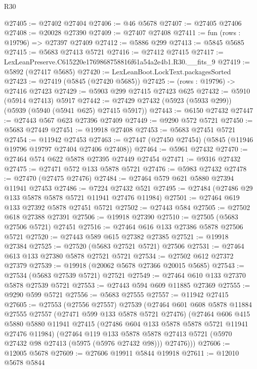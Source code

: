 \begin{lexlean}{R30}
\begin{coremodule}
@27405 := @27402 @27404
@27406 := @46 @5678
@27407 := @27405 @27406
@27408 := @20028 @27390
@27409 := @27407 @27408
@27411 := fun (rows : @19796) => @27397 @27409
@27412 := @5886 @299
@27413 := @5845 @5685
@27415 := @5683 @27413 @5721
@27416 := @27412 @27415
@27417 := LexLeanPreserve.C615220e1769868758816f61a54a2e4b1.R30.__fits_9
@27419 := @5892 (@27417 @5685)
@27420 := LexLeanBoot.LockText.packagesSorted
@27423 := @27419 (@5845 (@27420 @5685))
@27425 := (rows : @19796) -> @27416 @27423
@27429 := @5903 @299 @27415 @27423 @625
@27432 := @5910 (@5914 @27413) @5917
@27442 := @27429 @27432 (@5923 (@5933 @299)) (@5939 (@5940 (@5941 @625) @27415 @5917))
@27443 := @6150 @27432
@27447 := @27443 @567 @623 @27396 @27409
@27449 := @9290 @572 @5721
@27450 := @5683 @27449
@27451 := @19918 @27408
@27453 := @5683 @27451 @5721
@27454 := @11942 @27453
@27463 := @27447 (@27450 @27454) (@5845 (@11946 @19796 @19797 @27404 @27406 @27408))
@27464 := @5961 @27432
@27470 := @27464 @574 @622 @5878 @27395 @27449 @27454
@27471 := @9316 @27432
@27475 := @27471 @572 @133 @5878 @5721
@27476 := @5983 @27432
@27478 := @27470 (@27475 @27476)
@27484 := @27464 @579 @621 @5880 @27394 @11941 @27453
@27486 := @7224 @27432 @521
@27495 := @27484 (@27486 @29 @133 @5878 @5878 @5721 @11941 @27476 @11984)
@27501 := @27464 @619 @133 @27392 @5878 @27451 @5721
@27502 := @27443 @584
@27505 := @27502 @618 @27388 @27391
@27506 := @19918 @27390
@27510 := @27505 (@5683 @27506 @5721) @27451
@27516 := @27464 @616 @133 @27386 @5878 @27506 @5721
@27520 := @27443 @589 @615 @27382 @27385
@27521 := @19918 @27384
@27525 := @27520 (@5683 @27521 @5721) @27506
@27531 := @27464 @613 @133 @27380 @5878 @27521 @5721
@27534 := @27502 @612 @27372 @27379
@27539 := @19918 (@20062 @5678 @27366 @20015 @5685)
@27543 := @27534 (@5683 @27539 @5721) @27521
@27549 := @27464 @610 @133 @27370 @5878 @27539 @5721
@27553 := @27443 @594 @609 @11885 @27369
@27555 := @9290 @599 @5721
@27556 := @5683 @27555
@27557 := @11942 @27415
@27605 := @27553
    (@27556 @27557)
    @27539
    (@27464
      @601
      @608
      @5878
      @11884
      @27555
      @27557
      (@27471 @599 @133 @5878 @5721 @27476)
      (@27464
        @606
        @415
        @5880
        @5880
        @11941
        @27415
        (@27486 @604 @133 @5878 @5878 @5721 @11941 @27476 @11984)
        (@27464
          @119
          @133
          @5878
          @5878
          @27413
          @5721
          (@5970 @27432 @98 @27413 (@5975 (@5976 @27432 @98)))
          @27476)))
@27606 := @12005 @5678
@27609 := @27606 @19911 @5844 @19918
@27611 := @12010 @5678 @5844

\end{coremodule}
\end{lexlean}
